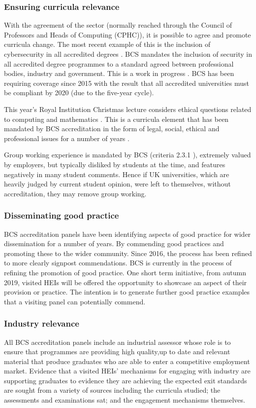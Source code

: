 \documentclass[sigconf]{acmart}
\begin{document}
\subsubsection{Ensuring curricula relevance}
With the agreement of the sector (normally reached through the Council of Professors and Heads of Computing (CPHC)), it is possible to agree and promote curricula change. The most recent example of this is the inclusion of cybersecurity in all accredited degrees \cite{Cricketal2019}. 
BCS mandates the inclusion of security in all accredited degree programmes to a standard agreed between professional bodies, industry and government. This is a work in progress \cite{Cricketal2019}. BCS has been requiring coverage since 2015 \cite[p.~17--18]{BCS2018a} with the result that all accredited universities must be compliant by 2020 (due to the five-year cycle). 

This year's Royal Institution Christmas lecture considers ethical questions related to computing and mathematics \cite{RoyalInstitution2019}. This is a curricula element that has been mandated by BCS accreditation in the form of legal, social, ethical and professional issues for a number of years \cite{Brooke2018}.

Group working experience is mandated by BCS (criteria 2.3.1 \cite [p31] {BCS2018a}), extremely valued by employers, but typically disliked by students at the time, and features negatively in many student comments. Hence if UK universities, which are heavily judged by current student opinion, were left to themselves, without accreditation, they may remove group working.  

\subsubsection{Disseminating good practice}
BCS accreditation panels have been identifying aspects of good practice for wider dissemination for a number of years. By commending good practices and promoting these to the wider community. Since 2016, the process has been refined to more clearly signpost commendations. BCS is currently in the process of refining the promotion of good practice. One short term initiative, from autumn 2019, visited HEIs will be offered the opportunity to showcase an aspect of their provision or practice. The intention is to generate further good practice examples that a visiting panel can potentially commend.
\subsubsection{Industry relevance}
All BCS accreditation panels include an industrial assessor whose role is to ensure that programmes are providing high quality,up to date and relevant material that produce graduates who are able to enter a competitive employment market. Evidence that a visited HEIs' mechanisms for engaging with industry are supporting graduates to evidence they are achieving the expected exit standards are sought from a variety of sources including the curricula studied; the assessments and examinations sat; and the engagement mechanisms themselves. 
\end{document}
